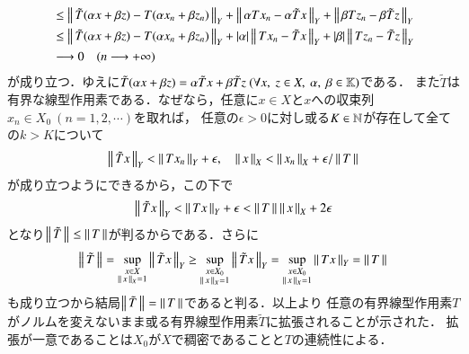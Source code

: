 \begin{qst}
\begin{prf}
\begin{align}
			&\leq \left\|\, \tilde{T}(\alpha x + \beta z) - T(\alpha x_n + \beta z_n)\, \right\|_{Y}
				+ \left\|\, \alpha Tx_n - \alpha \tilde{T}x\, \right\|_{Y} + \left\|\, \beta Tz_n - \beta \tilde{T}z\, \right\|_{Y} \\
			&\leq \left\|\, \tilde{T}(\alpha x + \beta z) - T(\alpha x_n + \beta z_n)\, \right\|_{Y}
				+ |\alpha| \left\|\, Tx_n - \tilde{T}x\, \right\|_{Y} + |\beta| \left\|\, Tz_n - \tilde{T}z\, \right\|_{Y} \\
			&\longrightarrow 0\quad (n \longrightarrow +\infty)
		\end{align}
		が成り立つ．ゆえに$\tilde{T}(\alpha x + \beta z) = \alpha \tilde{T}x + \beta \tilde{T}z\ (\forall x,\ z \in X,\ \alpha,\ \beta \in \mathbb{K})$である．
		また$\tilde{T}$は有界な線型作用素である．なぜなら，任意に$x \in X$と$x$への収束列$x_n \in X_0\ (n = 1,2,\cdots)$を取れば，
		任意の$\epsilon > 0$に対し或る$K \in \mathbb{N}$が存在して全ての$k > K$について
		\begin{align}
			\left\|\, \tilde{T}x\, \right\|_{Y} < \left\|\, Tx_n\, \right\|_{Y} + \epsilon, \quad \left\|\, x\, \right\|_{X} < \left\|\, x_n\, \right\|_{X} + \epsilon/\left\|\, T\, \right\|_{}
		\end{align}
		が成り立つようにできるから，この下で
		\begin{align}
			\left\|\, \tilde{T}x\, \right\|_{Y} < \left\|\, Tx\, \right\|_{Y} + \epsilon < \left\|\, T\, \right\|_{} \left\|\, x\, \right\|_{X} + 2\epsilon
		\end{align}
		となり$\left\|\, \tilde{T}\, \right\|_{} \leq \left\|\, T\, \right\|_{}$が判るからである．さらに
		\begin{align}
			\left\|\, \tilde{T}\, \right\|_{} = \operatorname*{sup}_{\substack{x \in X \\ \left\|\, x\, \right\|_{X} = 1}} \left\|\, \tilde{T}x\, \right\|_{Y} 
			\geq \operatorname*{sup}_{\substack{x \in X_0 \\ \left\|\, x\, \right\|_{X} = 1}} \left\|\, \tilde{T}x\, \right\|_{Y} 
			= \operatorname*{sup}_{\substack{x \in X_0 \\ \left\|\, x\, \right\|_{X} = 1}} \left\|\, Tx\, \right\|_{Y} = \left\|\, T\, \right\|_{}
		\end{align}
		も成り立つから結局$\left\|\, \tilde{T}\, \right\|_{} = \left\|\, T\, \right\|_{}$であると判る．以上より
		任意の有界線型作用素$T$がノルムを変えないまま或る有界線型作用素$\tilde{T}$に拡張されることが示された．
		拡張が一意であることは$X_0$が$X$で稠密であることと$T$の連続性による．
		\QED
\end{prf}

\begin{thm}[射影定理]
\end{thm}


\end{qst}
